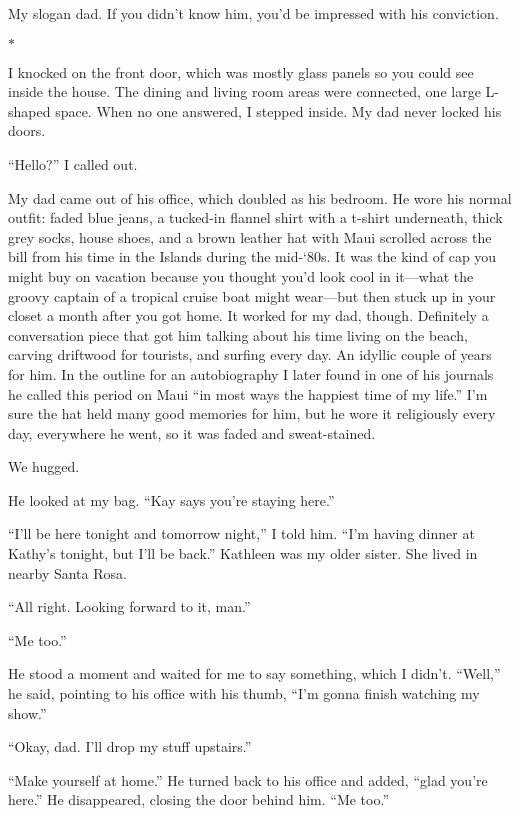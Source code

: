 \documentclass[12pt]{book}
\begin{document}
My slogan dad. If you didn't know him, you'd be impressed with his conviction.

\begin{center}$*$\end{center}

I knocked on the front door, which was mostly glass panels so you could see inside the house. The dining and living room areas were connected, one large L-shaped space. When no one answered, I stepped inside. My dad never locked his doors.

``Hello?'' I called out.

My dad came out of his office, which doubled as his bedroom. He wore his normal outfit: faded blue jeans, a tucked-in flannel shirt with a t-shirt underneath, thick grey socks, house shoes, and a brown leather hat with Maui scrolled across the bill from his time in the Islands during the mid-`80s. It was the kind of cap you might buy on vacation because you thought you'd look cool in it---what the groovy captain of a tropical cruise boat might wear---but then stuck up in your closet a month after you got home. It worked for my dad, though. Definitely a conversation piece that got him talking about his time living on the beach, carving driftwood for tourists, and surfing every day. An idyllic couple of years for him. In the outline for an autobiography I later found in one of his journals he called this period on Maui ``in most ways the happiest time of my life.'' I'm sure the hat held many good memories for him, but he wore it religiously every day, everywhere he went, so it was faded and sweat-stained.

We hugged.

He looked at my bag. ``Kay says you're staying here.''

``I'll be here tonight and tomorrow night,'' I told him. ``I'm having dinner at Kathy's tonight, but I'll be back.'' Kathleen was my older sister. She lived in nearby Santa Rosa.

``All right. Looking forward to it, man.''

``Me too.''

He stood a moment and waited for me to say something, which I didn't. ``Well,'' he said, pointing to his office with his thumb, ``I'm gonna finish watching my show.''

``Okay, dad. I'll drop my stuff upstairs.''

``Make yourself at home.'' He turned back to his office and added, ``glad you're here.'' He disappeared, closing the door behind him. ``Me too.''
\end{document}
